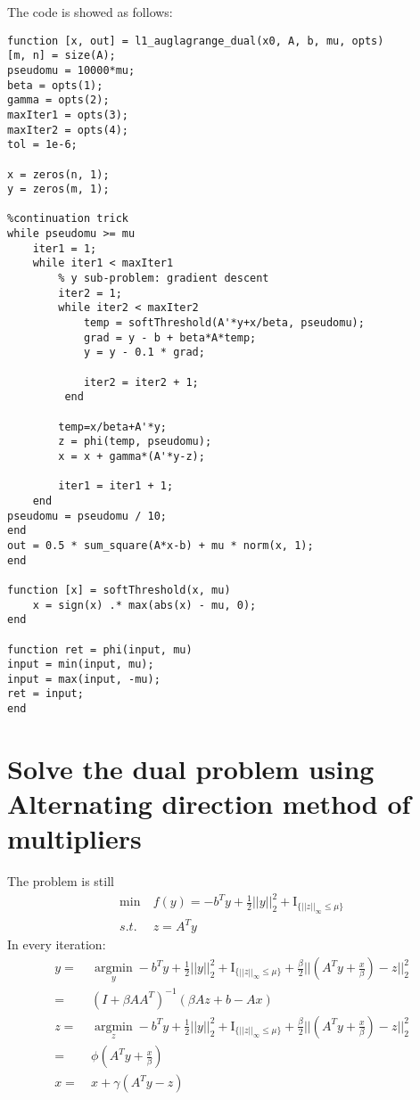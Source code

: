 \documentclass[11pt, oneside]{article}   	%
\begin{document}
The code is showed as follows:
\lstset{
 frame=single, 
breaklines=true,
language=MATLAB,
 }
\begin{lstlisting}
function [x, out] = l1_auglagrange_dual(x0, A, b, mu, opts)
[m, n] = size(A);
pseudomu = 10000*mu;
beta = opts(1);
gamma = opts(2);
maxIter1 = opts(3);
maxIter2 = opts(4);
tol = 1e-6;

x = zeros(n, 1);
y = zeros(m, 1);

%continuation trick
while pseudomu >= mu     
    iter1 = 1;
    while iter1 < maxIter1
        % y sub-problem: gradient descent       
        iter2 = 1;
        while iter2 < maxIter2
            temp = softThreshold(A'*y+x/beta, pseudomu);
            grad = y - b + beta*A*temp;
            y = y - 0.1 * grad;

            iter2 = iter2 + 1;
         end
        
        temp=x/beta+A'*y;
        z = phi(temp, pseudomu); 
        x = x + gamma*(A'*y-z);
                
        iter1 = iter1 + 1;
    end
pseudomu = pseudomu / 10;
end
out = 0.5 * sum_square(A*x-b) + mu * norm(x, 1);
end

function [x] = softThreshold(x, mu)
    x = sign(x) .* max(abs(x) - mu, 0);
end

function ret = phi(input, mu)
input = min(input, mu);
input = max(input, -mu);
ret = input;
end
\end{lstlisting}

\section{Solve the dual problem using Alternating direction method of multipliers}
The problem is still
\begin{align}
\min &\ f(y) = -b^Ty+\frac{1}{2}||y||^2_2 + \textrm{I}_{\{||z||_{\infty}\le\mu\}}\\
s.t. &  \ z = A^Ty
\end{align}
In every iteration:
\begin{align}
y = &\ \underset { y } { \operatorname { argmin } } -b^Ty+\frac{1}{2}||y||^2_2+\textrm{I}_{\{||z||_{\infty}\le\mu\}} + \frac{\beta}{2}|| (A^Ty+\frac{x}{\beta}) - z||^2_2\\
= & \ (I + \beta AA^T)^{-1}(\beta Az+b-Ax)\\
z =&\  \underset { z} { \operatorname { argmin } } -b^Ty+\frac{1}{2}||y||^2_2 +\textrm{I}_{\{||z||_{\infty}\le\mu\}}+ \frac{\beta}{2}|| (A^Ty+\frac{x}{\beta}) - z||^2_2\\
= &\ \phi(A^Ty+\frac{x}{\beta})\\
x = & \ x + \gamma(A^Ty-z)
\end{align}
\end{document}
